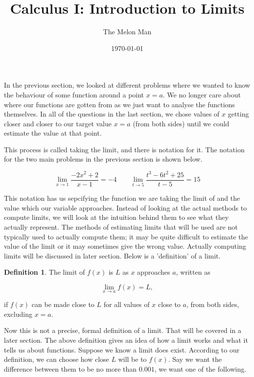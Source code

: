 \documentclass[12pt]{article}
\title{Calculus I: Introduction to Limits}
\author{The Melon Man}
\date{\today}
\theoremstyle{definition}
\newtheorem{definition}{Definition}
\begin{document}
\maketitle

In the previous section, we looked at different problems where we wanted to know the behaviour of some function around a point $x=a$.
We no longer care about where our functions are gotten from as we just want to analyse the functions themselves.
In all of the questions in the last section, we chose values of $x$ getting closer and closer to our target value $x=a$ (from both sides) until we could estimate the value at that point.

This process is called taking the limit, and there is notation for it.
The notation for the two main problems in the previous section is shown below.

\begin{equation*}
    \lim_{x\to1} \frac{-2x^2+2}{x-1} = -4 \qquad \lim_{t\to5} \frac{t^3-6t^2+25}{t-5} = 15
\end{equation*}

This notation has us sepcifying the function we are taking the limit of and the value which our variable approaches.
Instead of looking at the actual methods to compute limits, we will look at the intuition behind them to see what they actually represent.
The methods of estimating limits that will be used are not typically used to actually compute them; it may be quite difficult to estimate the value of the limit or it may sometimes give the wrong value.
Actually computing limits will be discussed in later section.
Below is a 'definition' of a limit.

\begin{definition}
    The limit of $f(x)$ is $L$ as $x$ approaches $a$, written as

    \begin{equation*}
        \lim_{x\to a} f(x) = L, \label{eq:1}
    \end{equation*}

    if $f(x)$ can be made close to $L$ for all values of $x$ close to $a$, from both sides, excluding $x=a$.
\end{definition}

Now this is not a precise, formal definition of a limit.
That will be covered in a later section.
The above definition gives an idea of how a limit works and what it tells us about functions.
Suppose we know a limit does exist.
According to our definition, we can choose how close $L$ will be to $f(x)$.
Say we want the difference between them to be no more than $0.001$, we want one of the following.
\end{document}
